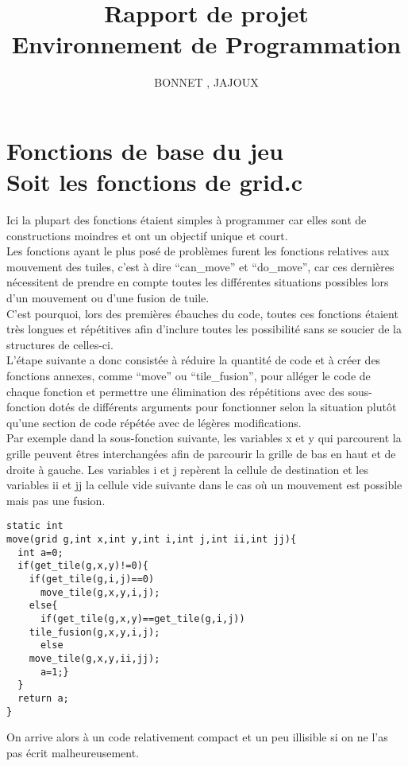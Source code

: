 \documentclass[12pt]{article}
\title{{\bf Rapport de projet} \\ \normalsize{Environnement de Programmation}}
\date{}
\author{\normalsize{BONNET \bsc{Thomas} , JAJOUX \bsc{Jeremy}}}
\begin{document}
\maketitle

\section{Fonctions de base du jeu
\\{\small Soit les fonctions de grid.c}}

Ici la plupart des fonctions étaient simples à programmer car elles sont de constructions moindres et ont un objectif unique et court.\\

Les fonctions ayant le plus posé de problèmes furent les fonctions relatives aux mouvement des tuiles, c'est à dire ``can\_move'' et ``do\_move'', car ces dernières nécessitent de prendre en compte toutes les différentes situations possibles lors d'un mouvement ou d'une fusion de tuile.\\

C'est pourquoi, lors des premières ébauches du code, toutes ces fonctions étaient très longues et répétitives afin d'inclure toutes les possibilité sans se soucier de la structures de celles-ci.\\

L'étape suivante a donc consistée à réduire la quantité de code et à créer des fonctions annexes, comme ``move'' ou ``tile\_fusion'', pour alléger le code de chaque fonction et permettre une élimination des répétitions avec des sous-fonction dotés de différents arguments pour fonctionner selon la situation plutôt qu'une section de code répétée avec de légères modifications.\\

Par exemple dand la sous-fonction suivante, les variables x  et y qui parcourent la grille peuvent êtres interchangées afin de parcourir la grille de bas en haut et de droite à gauche. Les variables i et j repèrent la cellule de destination et les variables ii et jj la cellule vide suivante dans le cas où un mouvement est possible mais pas une fusion.\\
\begin{verbatim}
static int
move(grid g,int x,int y,int i,int j,int ii,int jj){
  int a=0;
  if(get_tile(g,x,y)!=0){
    if(get_tile(g,i,j)==0)
      move_tile(g,x,y,i,j);
    else{
      if(get_tile(g,x,y)==get_tile(g,i,j))
	tile_fusion(g,x,y,i,j);
      else
	move_tile(g,x,y,ii,jj);
      a=1;}
  }
  return a;
}
\end{verbatim}
On arrive alors à un code relativement compact et un peu illisible si on ne l'as pas écrit malheureusement.\\
\end{document}
